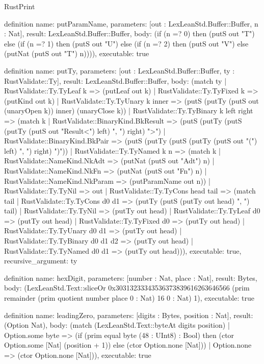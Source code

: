 \begin{lexlean}{RustPrint}
\begin{semanticmodule}
definition{
  name: putParamName,
  parameters: [out : LexLeanStd.Buffer::Buffer, n : Nat],
  result: LexLeanStd.Buffer::Buffer,
  body: (if (n =? 0) then (putS out "T") else (if (n =? 1) then (putS out "U") else (if (n =? 2) then (putS out "V") else (putNat (putS out "T") n)))),
  executable: true
}

definition{
  name: putTy,
  parameters: [out : LexLeanStd.Buffer::Buffer, ty : RustValidate::Ty],
  result: LexLeanStd.Buffer::Buffer,
  body: (match ty
    | RustValidate::Ty.TyLeaf k => (putLeaf out k)
    | RustValidate::Ty.TyFixed k => (putKind out k)
    | RustValidate::Ty.TyUnary k inner => (putS (putTy (putS out (unaryOpen k)) inner) (unaryClose k))
    | RustValidate::Ty.TyBinary k left right => (match k
      | RustValidate::BinaryKind.BkResult => (putS (putTy (putS (putTy (putS out "Result<") left) ", ") right) ">")
      | RustValidate::BinaryKind.BkPair => (putS (putTy (putS (putTy (putS out "(") left) ", ") right) ")"))
    | RustValidate::Ty.TyNamed k n => (match k
      | RustValidate::NameKind.NkAdt => (putNat (putS out "Adt") n)
      | RustValidate::NameKind.NkFn => (putNat (putS out "Fn") n)
      | RustValidate::NameKind.NkParam => (putParamName out n))
    | RustValidate::Ty.TyNil => out
    | RustValidate::Ty.TyCons head tail => (match tail
      | RustValidate::Ty.TyCons d0 d1 => (putTy (putS (putTy out head) ", ") tail)
      | RustValidate::Ty.TyNil => (putTy out head)
      | RustValidate::Ty.TyLeaf d0 => (putTy out head)
      | RustValidate::Ty.TyFixed d0 => (putTy out head)
      | RustValidate::Ty.TyUnary d0 d1 => (putTy out head)
      | RustValidate::Ty.TyBinary d0 d1 d2 => (putTy out head)
      | RustValidate::Ty.TyNamed d0 d1 => (putTy out head))),
  executable: true,
  recursive_argument: ty
}

definition{
  name: hexDigit,
  parameters: [number : Nat, place : Nat],
  result: Bytes,
  body: (LexLeanStd.Text::sliceOr 0x30313233343536373839616263646566 (prim remainder (prim quotient number place 0 : Nat) 16 0 : Nat) 1),
  executable: true
}

definition{
  name: leadingZero,
  parameters: [digits : Bytes, position : Nat],
  result: (Option Nat),
  body: (match (LexLeanStd.Text::byteAt digits position)
    | Option.some byte => (if (prim equal byte (48 : UInt8) : Bool) then (ctor Option.some [Nat] (position + 1)) else (ctor Option.none [Nat]))
    | Option.none => (ctor Option.none [Nat])),
  executable: true
}


\end{semanticmodule}
\end{lexlean}
